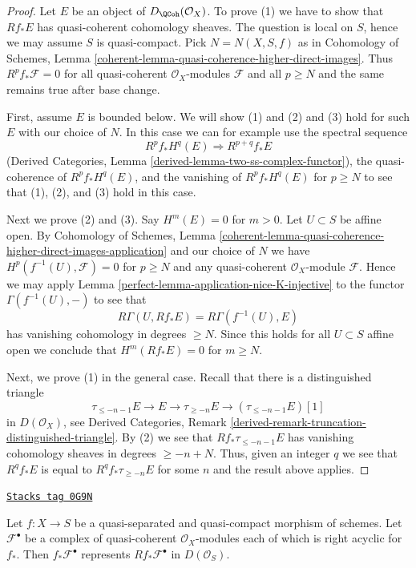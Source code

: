\begin{proof}

Let $E$ be an object of $D_\QCoh(\mathcal{O}_X)$. To prove (1) we have to
show that $Rf_*E$ has quasi-coherent cohomology sheaves. The question is local
on $S$, hence we may assume $S$ is quasi-compact. Pick $N = N(X, S, f)$ as in
Cohomology of Schemes, Lemma
\ref{coherent-lemma-quasi-coherence-higher-direct-images}.
Thus $R^pf_*\mathcal{F} = 0$ for all quasi-coherent $\mathcal{O}_X$-modules
$\mathcal{F}$ and all $p \geq N$ and the same remains true after base change.

\medskip\noindent
First, assume $E$ is bounded below. We will show (1) and (2) and (3) hold
for such $E$ with our choice of $N$. In this case we can for example use the
spectral sequence
$$
R^pf_*H^q(E) \Rightarrow R^{p + q}f_*E
$$
(Derived Categories, Lemma \ref{derived-lemma-two-ss-complex-functor}),
the quasi-coherence of $R^pf_*H^q(E)$, and the vanishing of $R^pf_*H^q(E)$
for $p \geq N$ to see that (1), (2), and (3) hold in this case.

\medskip\noindent
Next we prove (2) and (3). Say $H^m(E) = 0$ for $m > 0$.
Let $U \subset S$ be affine open. By Cohomology of Schemes, Lemma
\ref{coherent-lemma-quasi-coherence-higher-direct-images-application}
and our choice of $N$
we have $H^p(f^{-1}(U), \mathcal{F}) = 0$ for $p \geq N$
and any quasi-coherent $\mathcal{O}_X$-module $\mathcal{F}$.
Hence we may apply Lemma \ref{perfect-lemma-application-nice-K-injective}
to the functor $\Gamma(f^{-1}(U), -)$ to see that
$$
R\Gamma(U, Rf_*E) = R\Gamma(f^{-1}(U), E)
$$
has vanishing cohomology in degrees $\geq N$. Since this holds for
all $U \subset S$ affine open we conclude that $H^m(Rf_*E) = 0$
for $m \geq N$.

\medskip\noindent
Next, we prove (1) in the general case. Recall that there is a
distinguished triangle
$$
\tau_{\leq -n - 1}E \to E \to \tau_{\geq -n}E \to
(\tau_{\leq -n - 1}E)[1]
$$
in $D(\mathcal{O}_X)$, see Derived Categories, Remark
\ref{derived-remark-truncation-distinguished-triangle}.
By (2) we see that $Rf_*\tau_{\leq -n - 1}E$
has vanishing cohomology sheaves in degrees $\geq -n + N$.
Thus, given an integer $q$ we see that $R^qf_*E$ is equal
to $R^qf_*\tau_{\geq -n}E$ for some $n$ and the result
above applies.
\end{proof}

\begin{lemma}
\label{perfect-lemma-acyclicity-lemma}
\href{https://stacks.math.columbia.edu/tag/0G9N}{\texttt{Stacks tag 0G9N}}

Let $f : X \to S$ be a quasi-separated and quasi-compact morphism
of schemes. Let $\mathcal{F}^\bullet$ be a complex of quasi-coherent
$\mathcal{O}_X$-modules each of which is right acyclic for $f_*$.
Then $f_*\mathcal{F}^\bullet$ represents $Rf_*\mathcal{F}^\bullet$
in $D(\mathcal{O}_S)$.
\end{lemma}

